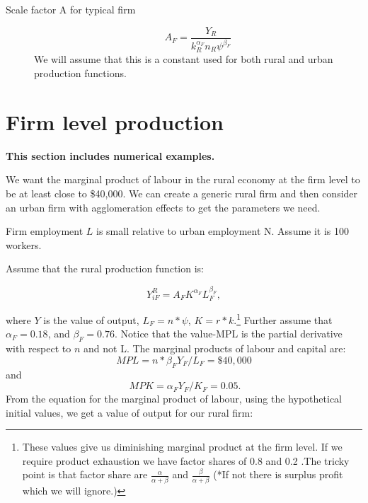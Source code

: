 \begin{description}


\item[Scale factor A for typical firm] 
\[A_F= \frac{Y_R}{k_R^{\alpha_F} {n_R\psi}^{\beta_F}}\]
We will assume that this is a constant used for both rural and urban production functions. 



\end{description}


\section{Firm level production}  
 \textbf{This section includes numerical examples.
 }


We want the marginal product of labour in the rural economy at the firm level to be at least close to \$40,000.  We can create a generic rural firm and then consider an urban firm with agglomeration effects to get the parameters we need. 

Firm employment $L$ is small relative to  urban employment {N}. Assume it is 100 workers. 

Assume that the rural production function is: 

\[ Y_{iF}^R=A_{F} K^{\alpha_F} L_F^{\beta_F}, \]

where $Y$ is the value of output, $L_F=n*\psi$, $K=r*k$.\footnote{These values give us diminishing marginal product at the firm level. If we require product exhaustion we have factor shares of  0.8 and 0.2 .The tricky point is that factor share are 
 $\frac{\alpha}{\alpha + \beta}$ and $\frac{\beta}{\alpha + \beta}$
(*If not there is surplus profit  which we will ignore.)}
Further assume that $\alpha_F=0.18 $,  and $\beta_F=0.76$. Notice that the value-MPL is the partial derivative with respect to $n$ and not L. 
The marginal products of labour and capital are: 
\[MPL=n*\beta_F Y_F/L_F=\$40,000\] and\[\ MPK=\alpha_F Y_F/K_F =0.05.\]
From the equation for the marginal product of labour, using the hypothetical initial values, we get a value of output for our rural firm:


